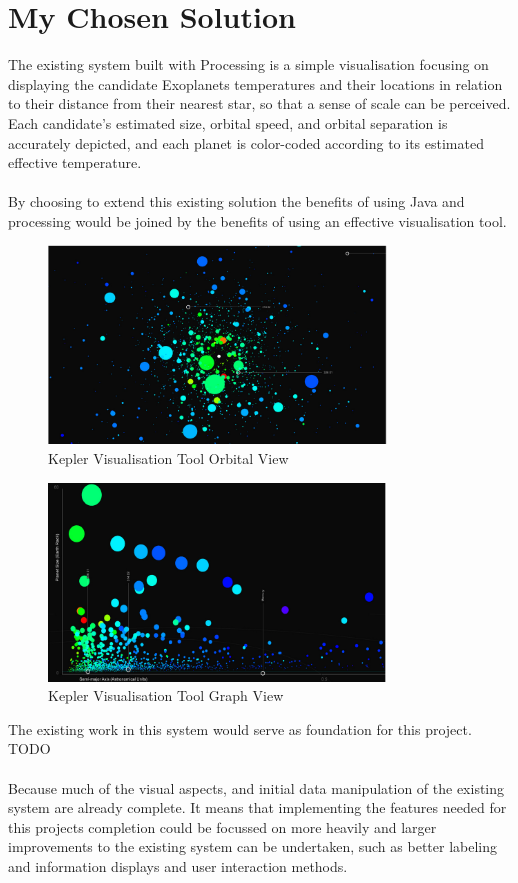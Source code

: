 \documentclass[11pt
              , a4paper
              , twoside
              , openright
              ]{report}
\begin{document}
\section{My Chosen Solution}
The existing system built with Processing is a simple visualisation focusing on displaying the candidate Exoplanets temperatures and their locations in relation to their distance from their nearest star, so that a sense of scale can be perceived. Each candidate’s estimated size, orbital speed, and orbital separation is accurately depicted, and each planet is color-coded according to its estimated effective temperature.
\\\\
By choosing to extend this existing solution the benefits of using Java and processing would be joined by the benefits of using an effective visualisation tool. \\
\begin{figure}[h!]
  \centering
      \includegraphics[width=0.8\textwidth]{images/kepler_orbital.jpg}
  \caption{Kepler Visualisation Tool Orbital View}
\end{figure}
\begin{figure}[h!]
  \centering
      \includegraphics[width=0.8\textwidth]{images/kepler_graph.jpg}
  \caption{Kepler Visualisation Tool Graph View}
\end{figure}
The existing work in this system would serve as foundation for this project. TODO
\\\\
Because much of the visual aspects, and initial data manipulation of the existing system are already complete. It means that implementing the features needed for this projects completion could be focussed on more heavily and larger improvements to the existing system can be undertaken, such as better labeling and information displays and user interaction methods.
\end{document}
